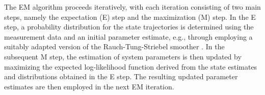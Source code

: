 The EM algorithm proceeds iteratively, with each iteration consisting of two main steps, namely the expectation (E) step and the maximization (M) step. In the E step, a probability distribution for the state trajectories is determined using the measurement data and an initial parameter estimate, e.g., through employing a suitably adapted version of the Rauch-Tung-Striebel smoother \cite{rauch1965maximum}. In the subsequent M step, the estimation of system parameters is then updated by maximizing the expected log-likelihood function derived from the state estimates and distributions obtained in the E step. The resulting updated parameter estimates are then employed in the next EM iteration. 
